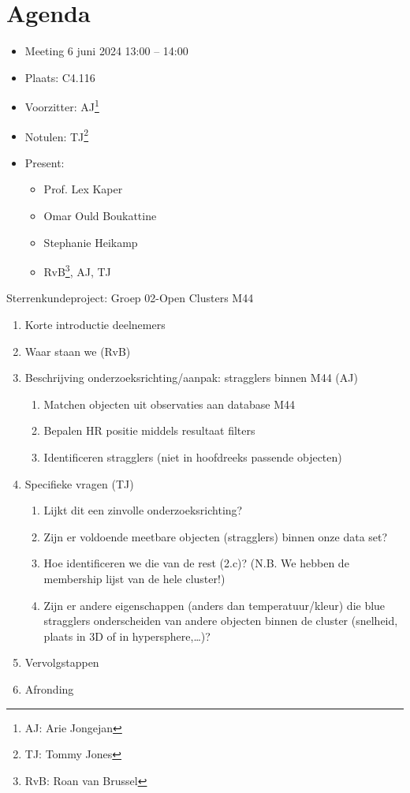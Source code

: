 \documentclass[11pt,a4paper]{article}
\begin{document}
\section{Agenda}
\begin{itemize}

\item Meeting 6 juni 2024 13:00 – 14:00
\item Plaats: C4.116

\item Voorzitter: AJ\footnote{AJ: Arie Jongejan}
\item Notulen: TJ\footnote{TJ: Tommy Jones}
\item Present:
\begin{itemize} 
\item Prof. Lex Kaper 
\item Omar Ould Boukattine
\item Stephanie Heikamp
\item RvB\footnote{RvB: Roan van Brussel}, AJ, TJ
\end{itemize}
\end{itemize}
Sterrenkundeproject:  Groep 02-Open Clusters M44 

\begin{enumerate}
\item	Korte introductie deelnemers 
\item	Waar staan we (RvB)
\item	Beschrijving onderzoeksrichting/aanpak: stragglers binnen M44 (AJ)
\begin{enumerate}
\item Matchen objecten uit observaties aan database M44
\item Bepalen HR positie middels resultaat filters
\item Identificeren stragglers (niet in hoofdreeks passende 
objecten)
\end{enumerate}
\item	Specifieke vragen (TJ)
\begin{enumerate} 
\item	Lijkt dit een zinvolle onderzoeksrichting?
\item	Zijn er voldoende meetbare objecten (stragglers) binnen onze data set?
\item	Hoe identificeren we die van de rest (2.c)? (N.B. We hebben de membership lijst van de hele cluster!)
\item	Zijn er andere eigenschappen (anders dan temperatuur/kleur) die blue stragglers onderscheiden van andere objecten binnen de cluster (snelheid, plaats in 3D of in hypersphere,…)?
\end{enumerate}
\item	Vervolgstappen
\item	Afronding
\end{enumerate}
\end{document}
